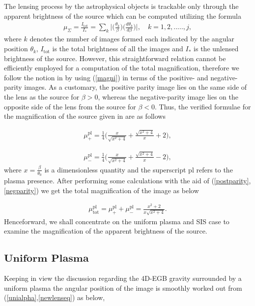 \documentclass[final,5p,times,twocolumn,unknownkeysallowed]{elsarticle}
\begin{document}
The lensing process by the astrophysical objects is trackable only through the
apparent brightness of the source which can be computed utilizing the formula
\begin{align}\label{magni}
\mu_{\Sigma}=\frac{I_\mathrm{tot}}{I_*}=\underset{k}\sum\bigg|\bigg(\frac{\theta_k}{\beta}\bigg)\bigg(\frac{d\theta_k}{d\beta}\bigg)\bigg|, \quad k=1,2,.....,j,
\end{align}
where $k$ denotes the number of images formed each indicated by the angular position $\theta_k$, $I_\mathrm{tot}$ is the total brightness of all the images
and $I_*$ is the unlensed brightness of the source. However, this
straightforward relation cannot be efficiently employed for a computation
of the total magnification, therefore we follow the notion in \cite{Schnei:1999a}
by using (\ref{magni}) in terms of the positive- and negative-parity images. As a customary, the positive
parity image lies on the same side of the lens as the source for $\beta>0$, whereas the negative-parity image lies on the opposite side of the lens from
the source for $\beta<0$. Thus, the verified formulae for the magnification of the source given in \cite{Schnei:1999a} are as follows

\begin{align}\label{postparity}
\mu^\mathrm{pl}_\mathrm{+}=\frac{1}{4}\bigg(\frac{x}{\sqrt{x^2+4}}+\frac{\sqrt{x^2+4}}{x}+2\bigg),
\end{align}

\begin{align}\label{negparity}
\mu^\mathrm{pl}_\mathrm{-}=\frac{1}{4}\bigg(\frac{x}{\sqrt{x^2+4}}+\frac{\sqrt{x^2+4}}{x}-2\bigg),
\end{align}
where $x=\frac{\beta}{\theta_0}$ is a dimensionless quantity and the superscript $\mathrm{pl}$ refers to the plasma presence. After performing
some calculations with the aid of (\ref{postparity},\ref{negparity})
we get the total magnification of the image as below

\begin{align}\label{magtot}
\mu^\mathrm{pl}_\mathrm{tot}=\mu^\mathrm{pl}_{+}+\mu^\mathrm{pl}_{-}=\frac{x^2+2}{x\sqrt{x^2+4}}.
\end{align}
Henceforward, we shall concentrate on the uniform plasma and SIS case to examine
the magnification of the apparent brightness of the source.

\subsection{$\mathbf{Uniform}$ $\mathbf{Plasma}$}
Keeping in view the discussion regarding  the 4D-EGB gravity surrounded by a uniform plasma
the angular position of the image is smoothly worked out from (\ref{unialpha},\ref{newlenseq}) as below,
\end{document}
